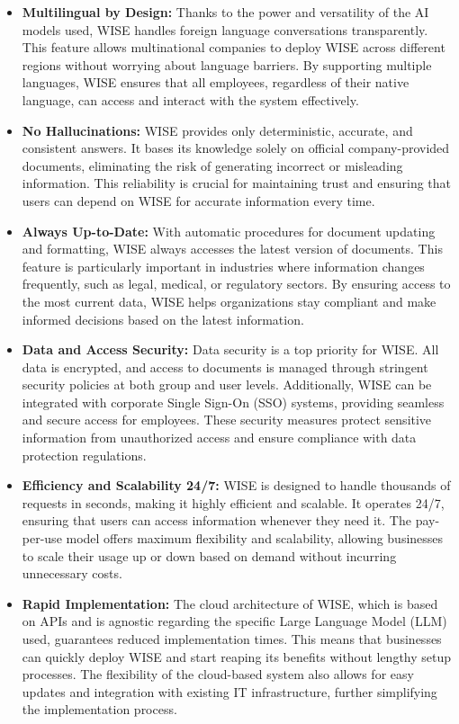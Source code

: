 \begin{itemize}
    \item \textbf{Multilingual by Design:} Thanks to the power and versatility of the AI models used, WISE handles foreign language conversations transparently. This feature allows multinational companies to deploy WISE across different regions without worrying about language barriers. By supporting multiple languages, WISE ensures that all employees, regardless of their native language, can access and interact with the system effectively.
    
    \item \textbf{No Hallucinations:} WISE provides only deterministic, accurate, and consistent answers. It bases its knowledge solely on official company-provided documents, eliminating the risk of generating incorrect or misleading information. This reliability is crucial for maintaining trust and ensuring that users can depend on WISE for accurate information every time.
    
    \item \textbf{Always Up-to-Date:} With automatic procedures for document updating and formatting, WISE always accesses the latest version of documents. This feature is particularly important in industries where information changes frequently, such as legal, medical, or regulatory sectors. By ensuring access to the most current data, WISE helps organizations stay compliant and make informed decisions based on the latest information.
    
    \item \textbf{Data and Access Security:} Data security is a top priority for WISE. All data is encrypted, and access to documents is managed through stringent security policies at both group and user levels. Additionally, WISE can be integrated with corporate Single Sign-On (SSO) systems, providing seamless and secure access for employees. These security measures protect sensitive information from unauthorized access and ensure compliance with data protection regulations.
    
    \item \textbf{Efficiency and Scalability 24/7:} WISE is designed to handle thousands of requests in seconds, making it highly efficient and scalable. It operates 24/7, ensuring that users can access information whenever they need it. The pay-per-use model offers maximum flexibility and scalability, allowing businesses to scale their usage up or down based on demand without incurring unnecessary costs.
    
    \item \textbf{Rapid Implementation:} The cloud architecture of WISE, which is based on APIs and is agnostic regarding the specific Large Language Model (LLM) used, guarantees reduced implementation times. This means that businesses can quickly deploy WISE and start reaping its benefits without lengthy setup processes. The flexibility of the cloud-based system also allows for easy updates and integration with existing IT infrastructure, further simplifying the implementation process. \cite{hpa2024}
\end{itemize}


